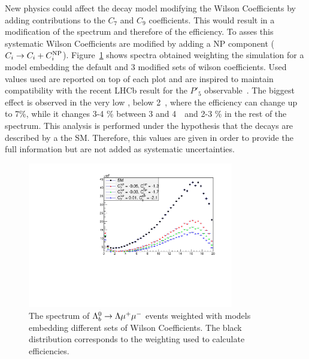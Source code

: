 New physics could affect the decay model modifying the Wilson Coefficients by adding
contributions to the $C_7$ and $C_9$ coefficients. This would result in a modification
of the \qsq spectrum and therefore of the efficiency.
To asses this systematic Wilson Coefficients are modified by adding a NP component
($C_i \rightarrow C_i + C_i^{ \rm NP}$). Figure~\ref{fig:wilson_q2} shows \qsq spectra
obtained weighting the simulation for a model embedding the default and 3 modified sets
of wilson coefficients. Used values used are reported on top of each plot and are inspired
to maintain compatibility with the recent LHCb result for the $P'_5$ observable~\cite{Descotes-Genon:2013wba}.
The biggest effect is observed in the very low \qsq, below 2~\gevgevcccc, where the efficiency can change
up to 7\%, while it changes 3-4 \% between 3 and 4~\gevgevcccc~and 2-3 \% in the rest of the spectrum.
This analysis is performed under the hypothesis that the decays are described by a the SM.
Therefore, this values are given in order to provide the full information but are not added 
as systematic uncertainties. 

\begin{figure}
\centering
\includegraphics[width=0.8\textwidth]{Lmumu/figs/wilson_q2.pdf}
\caption{The \qsq spectrum of $\Lambda^0_b\rightarrow\Lambda\mu^+\mu^-$ events weighted with models embedding different sets of Wilson Coefficients.
The black distribution corresponds to the weighting used to calculate efficiencies.}
\label{fig:wilson_q2}
\end{figure}


